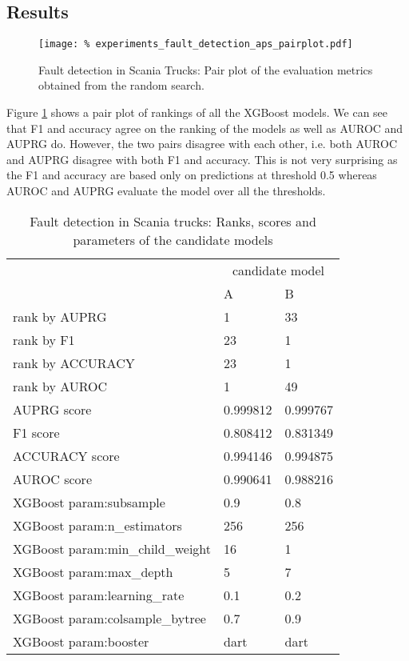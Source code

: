 \subsection{Results}

\begin{figure}
	\centering
    \texttt{[image: \%
        experiments\_fault\_detection\_aps\_pairplot.pdf]}
	\caption{Fault detection in Scania Trucks: Pair plot of the evaluation metrics obtained from the random search.}
	\label{fig:experiments_fault_detection_aps_pairplot}
\end{figure}

Figure \ref{fig:experiments_fault_detection_aps_pairplot} shows a pair plot of rankings of all the XGBoost models.
We can see that F1 and accuracy agree on the ranking of the models as well as AUROC and AUPRG do.
However, the two pairs disagree with each other, i.e. both AUROC and AUPRG disagree with both F1 and accuracy.
This is not very surprising as the F1 and accuracy are based only on predictions at threshold 0.5 whereas AUROC and AUPRG evaluate the model over all the thresholds.

\begin{table}
    \centering
    \begin{tabular}{lll}
    \toprule
    {} & \multicolumn{2}{c}{candidate model} \\
    {} &         A &         B & \\
    \midrule
    rank by AUPRG               &         1 & 33 \\
    rank by F1                  &        23 & 1 \\
    rank by ACCURACY            &        23 & 1 \\
    rank by AUROC               &         1 & 49 \\
    AUPRG score                       &  0.999812 & 0.999767 \\
    F1 score                          &  0.808412 & 0.831349 \\
    ACCURACY score                    &  0.994146 & 0.994875 \\
    AUROC score                       &  0.990641 & 0.988216 \\
    XGBoost param:subsample        &       0.9 &        0.8 \\
    XGBoost param:n\_estimators     &       256 &   256 \\
    XGBoost param:min\_child\_weight &        16 &      1 \\
    XGBoost param:max\_depth        &         5 &     7 \\
    XGBoost param:learning\_rate    &       0.1 &       0.2 \\
    XGBoost param:colsample\_bytree &       0.7 &       0.9 \\
    XGBoost param:booster          &      dart & dart \\
    \bottomrule
    \end{tabular}
    \caption{Fault detection in Scania trucks: Ranks, scores and parameters of the candidate models}
    \label{tab:experiments_fault_detection_aps_selected_models}
\end{table}

